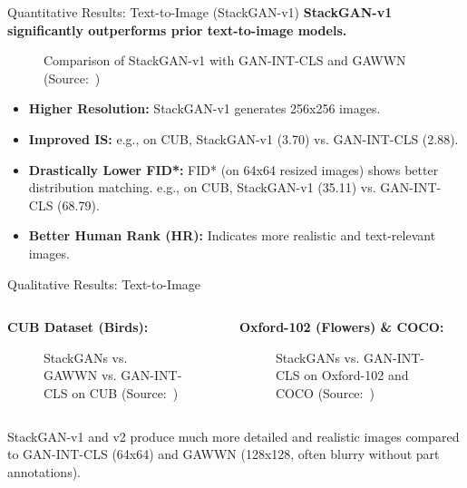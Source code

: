 \documentclass{beamer}
\newcommand{\paperfigure}[3][width=\textwidth]{%
    \begin{figure}%
        \centering%
        \caption{#3 (Source:~\cite{stackgan++})}%
        \label{fig:#2}%
    \end{figure}%
}
\newcommand{\papertable}[3][width=\textwidth]{%
    \begin{figure}%
        \centering%
        \caption{#3 (Source:~\cite{stackgan++})}%
        \label{tab:#2}%
    \end{figure}%
}
\begin{document}
\begin{frame}{Quantitative Results: Text-to-Image (StackGAN-v1)}
    \textbf{StackGAN-v1 significantly outperforms prior text-to-image models.}
    \papertable[width=\textwidth]{table2_stackgan_v1_comparison}{Comparison of StackGAN-v1 with GAN-INT-CLS and GAWWN}
    \begin{itemize}
        \item \textbf{Higher Resolution:} StackGAN-v1 generates 256x256 images.
        \item \textbf{Improved IS:} e.g., on CUB, StackGAN-v1 (3.70) vs. GAN-INT-CLS (2.88).
        \item \textbf{Drastically Lower FID*:} FID* (on 64x64 resized images) shows better distribution matching. e.g., on CUB, StackGAN-v1 (35.11) vs. GAN-INT-CLS (68.79).
        \item \textbf{Better Human Rank (HR):} Indicates more realistic and text-relevant images.
    \end{itemize}
\end{frame}

\begin{frame}{Qualitative Results: Text-to-Image}
    \begin{columns}[T]
        \begin{column}{0.5\textwidth}
            \textbf{CUB Dataset (Birds):}
            \paperfigure[width=\textwidth]{fig3_cub_examples}{StackGANs vs. GAWWN vs. GAN-INT-CLS on CUB}
        \end{column}
        \begin{column}{0.5\textwidth}
            \textbf{Oxford-102 (Flowers) \& COCO:}
            \paperfigure[width=\textwidth]{fig4_oxford_coco_examples}{StackGANs vs. GAN-INT-CLS on Oxford-102 and COCO}
        \end{column}
    \end{columns}
    \vspace{0.2cm}
    StackGAN-v1 and v2 produce much more detailed and realistic images compared to GAN-INT-CLS (64x64) and GAWWN (128x128, often blurry without part annotations).
\end{frame}
\end{document}
